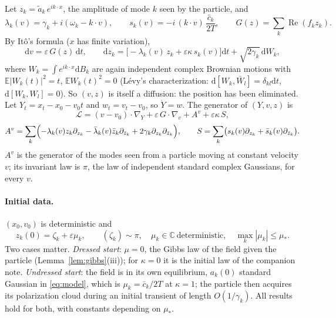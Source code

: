 \documentclass[11pt]{article}
\newcommand{\dd}{\mathrm{d}}
\newcommand{\E}{\mathbb{E}}
\newcommand{\eps}{\varepsilon}
\newcommand{\cL}{\mathcal{L}}
\renewcommand{\Re}{\operatorname{Re}}
\theoremstyle{remark}
\begin{document}
Let $z_k=\tilde a_k\,e^{ik\cdot x}$, the amplitude of mode $k$ seen by the
particle, and
\begin{equation}
  \lambda_k(v)=\gamma_k+i(\omega_k-k\cdot v),\qquad
  s_k(v)=-i\,(k\cdot v)\,\frac{\bar c_k}{2T},\qquad
  G(z)=\sum_k\Re(f_kz_k).
\end{equation}
By It\^o's formula ($x$ has finite variation),
\begin{equation}
  \dd v=\eps\,G(z)\,\dd t,\qquad
  \dd z_k=\bigl[-\lambda_k(v)\,z_k+\eps\kappa\,s_k(v)\bigr]\dd t
     +\sqrt{2\gamma_k}\,\dd W_k,
  \label{eq:vz}
\end{equation}
where $W_k=\int e^{ik\cdot x}\dd B_k$ are again independent complex Brownian
motions with $\E|W_k(t)|^2=t$, $\E W_k(t)^2=0$ (L\'evy's characterization:
$\dd[W_k,\bar W_l]=\delta_{kl}\dd t$, $\dd[W_k,W_l]=0$). So $(v,z)$ is
itself a diffusion: the position has been eliminated. Let
$Y_t=x_t-x_0-v_0t$ and $w_t=v_t-v_0$, so $\dot Y=w$. The generator of
$(Y,v,z)$ is
\begin{equation}
  \cL=(v-v_0)\cdot\nabla_Y+\eps\,G\cdot\nabla_v+A^v+\eps\kappa\,S,
  \label{eq:gen}
\end{equation}
\[
  A^v=\sum_k\Bigl(-\lambda_k(v)z_k\partial_{z_k}
     -\bar\lambda_k(v)\bar z_k\partial_{\bar z_k}
     +2\gamma_k\partial_{z_k}\partial_{\bar z_k}\Bigr),
  \qquad
  S=\sum_k\bigl(s_k(v)\partial_{z_k}+\bar s_k(v)\partial_{\bar z_k}\bigr).
\]
$A^v$ is the generator of the modes seen from a particle moving at constant
velocity $v$; its invariant law is $\pi$, the law of independent standard
complex Gaussians, for every $v$.

\paragraph{Initial data.} $(x_0,v_0)$ is deterministic and
\begin{equation}
  z_k(0)=\zeta_k+\eps\mu_k,\qquad
  (\zeta_k)\sim\pi,\quad \mu_k\in\mathbb{C}\ \text{deterministic},\quad
  \max_k|\mu_k|\le\mu_* .
  \label{eq:init}
\end{equation}
Two cases matter. \emph{Dressed start}: $\mu=0$, the Gibbs law of the field
given the particle (Lemma~\ref{lem:gibbs}(iii)); for $\kappa=0$ it is the
initial law of the companion note. \emph{Undressed start}: the field is in
its own equilibrium, $a_k(0)$ standard Gaussian in \eqref{eq:model}, which
is $\mu_k=\bar c_k/2T$ at $\kappa=1$; the particle then acquires its
polarization cloud during an initial transient of length $O(1/\gamma_k)$.
All results hold for both, with constants depending on $\mu_*$.
\end{document}
